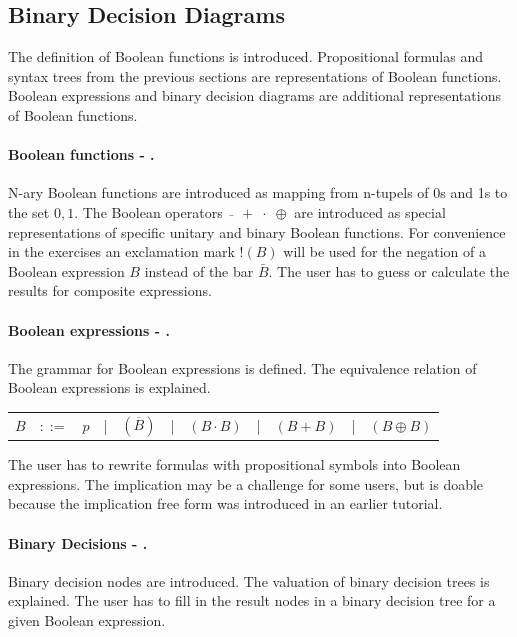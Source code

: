 \subsection{Binary Decision Diagrams}

The definition of Boolean functions is introduced. 
Propositional formulas and syntax trees from the previous sections are representations of Boolean functions.
Boolean expressions and binary decision diagrams are additional representations of Boolean functions.

\paragraph{Boolean functions - .}
\label{tut:51}
N-ary Boolean functions are introduced as mapping from n-tupels of 0s and 1s to the set ${0,1}$.
The Boolean operators $\bar{ \;\;}\;+\;\cdot\;\oplus$ are introduced as special representations of
specific unitary and binary Boolean functions. 
For convenience  in the exercises
an exclamation mark $!(B)$ 
will be used for the negation of a Boolean expression $B$ instead of the bar $\bar{B}$. 
The user has to guess or calculate the results for composite expressions.

\paragraph{Boolean expressions - .}
\label{tut:52}
The grammar for Boolean expressions is defined. 
The equivalence relation of Boolean expressions is explained.

\begin{center}
\begin{tabular}{rcccccccccc}
$B$	&$::=$	&$p$ 	
	&|		& $(\overline{B})$ 
	&|		&  $(B \cdot B)$ 
	&|		&  $(B + B)$ 
	&|		&  $(B \oplus B)$ \\
\end{tabular}
\end{center}

The user has to rewrite formulas with propositional symbols into Boolean expressions.
The implication may be a challenge for some users, 
but is doable because the implication free form was introduced 
in an earlier tutorial.

\paragraph{Binary Decisions - .}
\label{tut:53}
Binary decision nodes are introduced. 
The valuation of binary decision trees is explained.
The user has to fill in the result nodes in a binary decision tree for a given Boolean expression.

